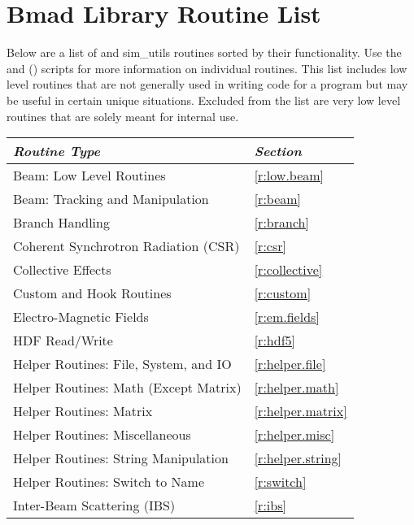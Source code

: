 \chapter{Bmad Library Routine List}

Below are a list of \bmad and sim_utils routines sorted by their
functionality.  Use the  and  ()
scripts for more information on individual routines.
This list includes low level routines that are not generally used in
writing code for a program but may be useful in certain unique
situations.  Excluded from the list are very low level routines that are
solely meant for \bmad internal use.

\toffset
\begin{center}
\begin{tabular}{ll} \toprule
{\em Routine Type} & {\em Section} \\ \midrule
  Beam: Low Level Routines                    & \ref{r:low.beam}       \\
  Beam: Tracking and Manipulation             & \ref{r:beam}           \\
  Branch Handling                             & \ref{r:branch}         \\
  Coherent Synchrotron Radiation (CSR)        & \ref{r:csr}            \\
  Collective Effects                          & \ref{r:collective}     \\
  Custom and Hook Routines                    & \ref{r:custom}         \\
  Electro-Magnetic Fields                     & \ref{r:em.fields}      \\
  HDF Read/Write                              & \ref{r:hdf5}           \\
  Helper Routines: File, System, and IO       & \ref{r:helper.file}    \\
  Helper Routines: Math (Except Matrix)       & \ref{r:helper.math}    \\
  Helper Routines: Matrix                     & \ref{r:helper.matrix}  \\
  Helper Routines: Miscellaneous              & \ref{r:helper.misc}    \\
  Helper Routines: String Manipulation        & \ref{r:helper.string}  \\
  Helper Routines: Switch to Name             & \ref{r:switch}         \\
  Inter-Beam Scattering (IBS)                 & \ref{r:ibs}            \\

\end{tabular}
\end{center}
